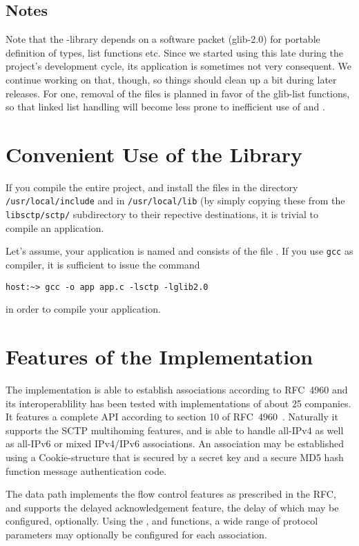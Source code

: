 \documentclass[10pt]{article}
\newcommand{\lib}{ \libname{libsctp}-library }
\begin{document}
\subsection{Notes}
Note that the \lib depends on a software packet (glib-2.0) for portable definition of
types, list functions etc.
Since we started using this late during the
project's development cycle, its application is sometimes not very 
consequent. We continue working on that, though, so things should clean
up a bit during later releases. For one, removal of the 
files is planned in favor of the glib-list functions,
so that linked list handling will become less prone
to inefficient use of  and .

\section{Convenient Use of the Library}
If you compile the entire project, and install the files
 in the directory \texttt{/usr/local/include}
and  in \texttt{/usr/local/lib} (by simply
copying these from the \texttt{libsctp/sctp/} subdirectory
to their repective destinations, it is trivial to compile
an application.

Let's assume, your application is named 
and consists of the file . If you use \texttt{gcc} as
compiler, it is sufficient to issue the command
\begin{verbatim}
host:~> gcc -o app app.c -lsctp -lglib2.0
\end{verbatim}
in order to compile your application.

\section{Features of the Implementation}
The implementation is able to establish associations according to RFC~4960 and
its interoperablility has been tested with implementations of about 25 companies.
It features a complete API according to section 10 of RFC~4960~\cite{RFC4960}.
Naturally it supports the SCTP multihoming features, and is able to handle
all-IPv4  as well as all-IPv6 or mixed IPv4/IPv6 associations.
An association may be established using a Cookie-structure that is secured
by a secret key and a secure MD5 hash function message authentication
code.

The data path implements the flow control features as prescribed in the RFC,
and supports the delayed acknowledgement feature, the delay of which may be configured,
optionally.
Using the ,  and
 functions, a wide range of protocol parameters
may optionally be configured for each association.
\end{document}
